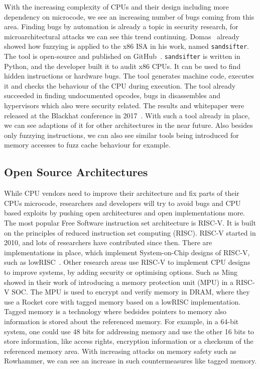 With the increasing complexity of CPUs and their design including more
dependency on microcode, we see an increasing number of bugs coming from this
area. Finding bugs by automation is already a topic in security research, for
microarchitectural attacks we can see this trend continuing.
Domas~\cite{sandsifter} already showed how fuzzying is applied to the x86 ISA in
his work, named \texttt{sandsifter}. The tool is open-source and published on
GitHub~\cite{sandsifterurl}. \texttt{sandsifter} is written in Python, and the
developer built it to audit x86 CPUs. It can be used to find hidden instructions
or hardware bugs. The tool generates machine code, executes it and checks the
behaviour of the CPU during execution. The tool already succeeded in finding
undocumented opcodes, bugs in disassembles and hypervisors which also were
security related. The results and whitepaper were released at the Blackhat
conference in 2017~\cite{sandsifter}. With such a tool already in place, we can
see adaptions of it for other architectures in the near future. Also besides
only fuzzying instructions, we can also see similar tools being introduced for
memory accesses to fuzz cache behaviour for example.

\subsection{Open Source Architectures}

While CPU vendors need to improve their architecture and fix parts of their
CPU\textquotesingle s microcode, researchers and developers will try to avoid
bugs and CPU based exploits by pushing open architectures and open
implementations more. The most popular Free Software instruction set
architecture is RISC-V. It is built on the principles of reduced instruction
set computing (RISC). RISC-V started in 2010, and lots of researchers have
contributed since then. There are implementations in place, which implement
System-on-Chip designs of RISC-V, such as lowRISC~\cite{lowrisc}. Other
research areas use RISC-V  to implement CPU designs to improve systems, by
adding security or optimising options. Such as Ming~\etal~\cite{smarts} showed
in their work of introducing a memory protection unit (MPU) in a RISC-V SOC.
The MPU is used to encrypt and verify memory in DRAM, where they use a Rocket
core with tagged memory based on a lowRISC implementation. Tagged memory is a
technology where bedsides pointers to memory also information is stored about
the referenced memory. For example, in a 64-bit system, one could use 48 bits
for addressing memory and use the other 16 bits to store information, like
access rights, encryption information or a checksum of the referenced memory
area. With increasing attacks on memory safety such as Rowhammer, we can see an
increase in such countermeasures like tagged memory.

